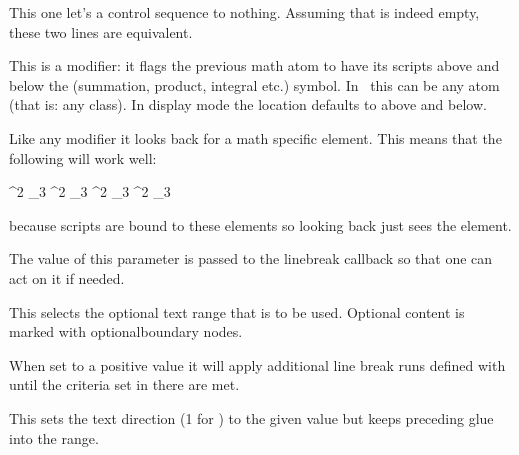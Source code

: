 \startnewprimitive[title={\prm {lettonothing}}]

This one let's a control sequence to nothing. Assuming that \type {\empty}
is indeed empty, these two lines are equivalent.

\starttyping
\let         \foo\empty
{}\oof
\stoptyping

\stopnewprimitive

\startoldprimitive[title={\prm {limits}}]

This is a modifier: it flags the previous math atom to have its scripts above and
below the (summation, product, integral etc.) symbol. In \LUAMETATEX\ this can be
any atom (that is: any class). In display mode the location defaults to above and
below.

Like any modifier it looks back for a math specific element. This means that the
following will work well:

\starttyping
\sum \limits ^2 _3
\sum ^2 \limits _3
\sum ^2 _3 \limits
\sum ^2 _3 \limits \nolimits \limits
\stoptyping

because scripts are bound to these elements so looking back just sees the element.

\stopoldprimitive

\startnewprimitive[title={\prm {linebreakchecks}}]

The value of this parameter is passed to the linebreak callback so that one can
act on it if needed.

\stopnewprimitive

\startnewprimitive[title={\prm {linebreakoptional}}]

This selects the optional text range that is to be used. Optional content is
marked with {optionalboundary} nodes.

\stopnewprimitive

\startnewprimitive[title={\prm {linebreakpasses}}]

When set to a positive value it will apply additional line break runs defined
with  until the criteria set in there are met.

\stopnewprimitive

\startnewprimitive[title={\prm {linedirection}}]

This sets the text direction (1 for ) to the given value but keeps
preceding glue into the range.

\stopnewprimitive

\startoldprimitive[title={\prm {linepenalty}}]

